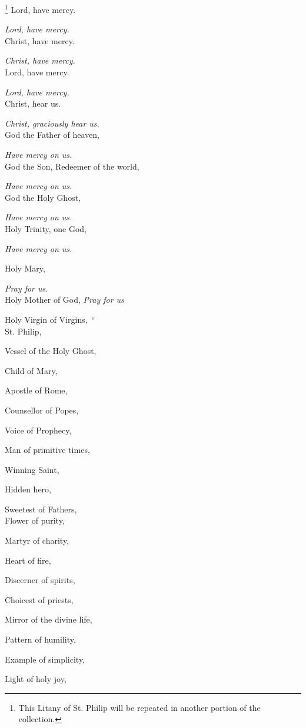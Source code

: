 
\footnote{This Litany of St. Philip will be repeated in another portion of the
collection.} Lord, have mercy.

\emph{Lord, have mercy.}\\
Christ, have mercy.

\emph{Christ, have mercy.}\\
Lord, have mercy.

\emph{Lord, have mercy.}\\
Christ, hear us.

\emph{Christ, graciously hear us.}\\
God the Father of heaven,

\emph{Have mercy on us.}\\
God the Son, Redeemer of the world,

\emph{Have mercy on us.}\\
God the Holy Ghost,

\emph{Have mercy on us.}\\
Holy Trinity, one God,

\emph{Have mercy on us.}

Holy Mary,

\emph{Pray for us.}\\
Holy Mother of God,
\emph{Pray for us}

Holy Virgin of
Virgins, \emph{``}\emph{}\\
St. Philip,

Vessel of the Holy Ghost,

Child of Mary,

Apostle of Rome, 

Counsellor of Popes,

Voice of Prophecy,

Man of primitive times,

Winning Saint,

Hidden hero,

Sweetest of Fathers,\emph{}\\
Flower of purity,

Martyr of charity,

Heart of fire,

Discerner of spirits,

Choicest of priests,

Mirror of the divine life,

Pattern of humility,

Example of simplicity,

Light of holy joy,

